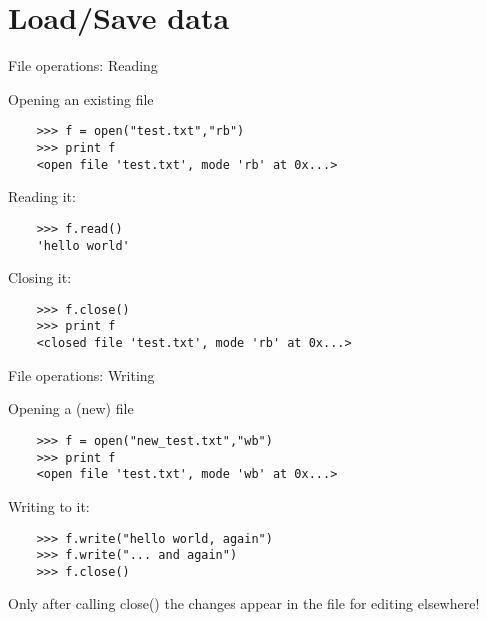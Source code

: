 
\section{Load/Save data}

\begin{frame}[fragile]{File operations: Reading}

  Opening an existing file 

  \begin{verbatim}
    >>> f = open("test.txt","rb")
    >>> print f
    <open file 'test.txt', mode 'rb' at 0x...>
  \end{verbatim}
  \bigskip
  \pause
  Reading it:
  \begin{verbatim}
    >>> f.read()
    'hello world'
  \end{verbatim}
  \pause
  \bigskip
  Closing it:
  \begin{verbatim}
    >>> f.close()
    >>> print f
    <closed file 'test.txt', mode 'rb' at 0x...>
  \end{verbatim}

\end{frame}


\begin{frame}[fragile]{File operations: Writing}

  Opening a (new) file 

  \begin{verbatim}
    >>> f = open("new_test.txt","wb")
    >>> print f
    <open file 'test.txt', mode 'wb' at 0x...>
  \end{verbatim}
  \bigskip
  \pause
  Writing to it:
  \begin{verbatim}
    >>> f.write("hello world, again")
    >>> f.write("... and again")
    >>> f.close()
  \end{verbatim}
  \pause
  \vspace{0.65cm}

  \begin{arrowlist}
  \item Only after calling close() the changes appear in the file for
    editing elsewhere!
  \end{arrowlist}

\end{frame}

